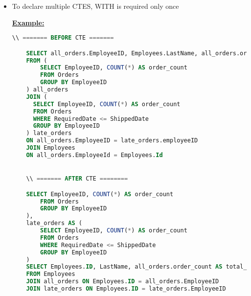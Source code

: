 \documentclass[12pt]{article}
\begin{document}
\begin{itemize}
    \item To declare multiple CTES, WITH is required only once

    \bigskip

    \underline{\textbf{Example:}}

    \bigskip

    \begin{lstlisting}[language=SQL]
    \\ ======= BEFORE CTE =======

    SELECT all_orders.EmployeeID, Employees.LastName, all_orders.order_count AS total_order_count, late_orders.order_count AS late_order_count
    FROM (
        SELECT EmployeeID, COUNT(*) AS order_count
        FROM Orders
        GROUP BY EmployeeID
    ) all_orders
    JOIN (
      SELECT EmployeeID, COUNT(*) AS order_count
      FROM Orders
      WHERE RequiredDate <= ShippedDate
      GROUP BY EmployeeID
    ) late_orders
    ON all_orders.EmployeeID = late_orders.employeeID
    JOIN Employees
    ON all_orders.EmployeeId = Employees.Id


    \\ ======= AFTER CTE ========

    SELECT EmployeeID, COUNT(*) AS order_count
        FROM Orders
        GROUP BY EmployeeID
    ),
    late_orders AS (
        SELECT EmployeeID, COUNT(*) AS order_count
        FROM Orders
        WHERE RequiredDate <= ShippedDate
        GROUP BY EmployeeID
    )
    SELECT Employees.ID, LastName, all_orders.order_count AS total_order_count, late_orders.order_count AS late_order_count
    FROM Employees
    JOIN all_orders ON Employees.ID = all_orders.EmployeeID
    JOIN late_orders ON Employees.ID = late_orders.EmployeeID
    \end{lstlisting}
\end{itemize}
\end{document}
